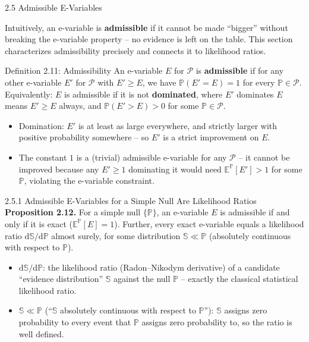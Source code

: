 \documentclass[aspectratio=169,10pt]{beamer}
\newcommand{\PP}{\mathbb{P}}
\newcommand{\EE}{\mathbb{E}}
\newcommand{\calP}{\mathcal{P}}
\begin{document}
\begin{frame}[allowframebreaks]{2.5 Admissible E-Variables}

Intuitively, an e-variable is \textbf{admissible} if it cannot be made
``bigger'' without breaking the e-variable property -- no evidence is left
on the table. This section characterizes admissibility precisely and
connects it to likelihood ratios.

  \begin{block}{Definition 2.11: Admissibility}
    An e-variable $E$ for $\calP$ is \textbf{admissible} if for any other
    e-variable $E'$ for $\calP$ with $E'\ge E$, we have $\PP(E'=E)=1$ for
    every $\PP\in\calP$. Equivalently: $E$ is admissible if it is not
    \textbf{dominated}, where $E'$ dominates $E$ means $E'\ge E$ always,
    and $\PP(E'>E)>0$ for some $\PP\in\calP$.
  \end{block}

  \begin{itemize}
    \item Domination: $E'$ is at least as large everywhere, and strictly
      larger with positive probability somewhere -- so $E'$ is a strict
      improvement on $E$.
    \item The constant $1$ is a (trivial) admissible e-variable for any
      $\calP$ -- it cannot be improved because any $E'\ge1$ dominating it
      would need $\EE^\PP[E']>1$ for some $\PP$, violating the e-variable
      constraint.
    \end{itemize}

  \begin{block}{2.5.1 Admissible E-Variables for a Simple Null Are Likelihood Ratios}
    \textbf{Proposition 2.12.} For a simple null $\{\PP\}$, an e-variable
    $E$ is admissible if and only if it is exact ($\EE^\PP[E]=1$). Further,
    every exact e-variable equals a likelihood ratio
    $\mathrm{d}\mathbb{S}/\mathrm{d}\PP$ almost surely, for some
    distribution $\mathbb{S} \ll \PP$ (absolutely continuous with respect
    to $\PP$).
  \end{block}

  \begin{itemize}
    \item $\mathrm{d}\mathbb{S}/\mathrm{d}\PP$: the likelihood ratio (Radon--Nikodym
      derivative) of a candidate ``evidence distribution'' $\mathbb{S}$ against
      the null $\PP$ -- exactly the classical statistical likelihood ratio.
    \item $\mathbb{S}\ll\PP$ (``$\mathbb{S}$ absolutely continuous with respect to
      $\PP$''): $\mathbb{S}$ assigns zero probability to every event that $\PP$
      assigns zero probability to, so the ratio is well defined.
  \end{itemize}


\end{frame}
\end{document}
